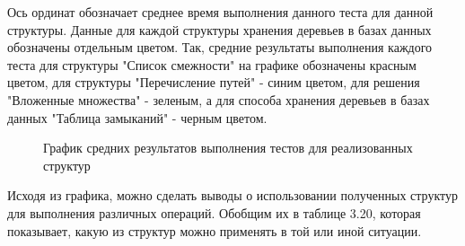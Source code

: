 \documentclass[a4paper,14pt]{extreport}
\theoremstyle{definition}
\begin{document}
Ось ординат обозначает среднее время выполнения данного теста для данной структуры. Данные для каждой структуры хранения деревьев в базах данных обозначены отдельным цветом.
 Так, средние результаты выполнения каждого теста для структуры "Список смежности" на графике обозначены красным цветом,
для структуры "Перечисление путей" - синим цветом,
для решения "Вложенные множества" - зеленым,
 а для способа хранения деревьев в базах данных "Таблица замыканий" - черным цветом.
\begin{figure}
\caption{График средних результатов выполнения тестов для реализованных структур}
\label{fig:3}


\end{figure}

Исходя из графика, можно сделать выводы о использовании полученных структур для выполнения различных операций. Обобщим их в таблице 3.20, которая показывает, какую из структур можно применять в той или иной ситуации.
\end{document}
